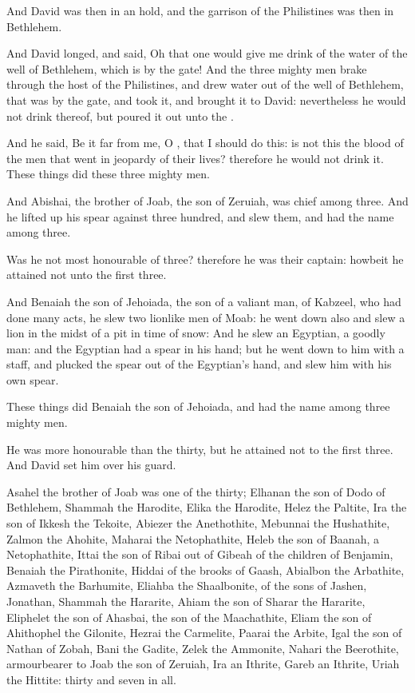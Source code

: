 \Verse And David was then in an hold, and the garrison of the Philistines was then in Bethlehem.

\Verse And David longed, and said, Oh that one would give me drink of the water of the well of Bethlehem, which is by the gate!  \Verse And the three mighty men brake through the host of the Philistines, and drew water out of the well of Bethlehem, that was by the gate, and took it, and brought it to David: nevertheless he would not drink thereof, but poured it out unto the \LORD.

\Verse And he said, Be it far from me, O \LORD, that I should do this: is not this the blood of the men that went in jeopardy of their lives?  therefore he would not drink it. These things did these three mighty men.

\Verse And Abishai, the brother of Joab, the son of Zeruiah, was chief among three. And he lifted up his spear against three hundred, and slew them, and had the name among three.

\Verse Was he not most honourable of three? therefore he was their captain: howbeit he attained not unto the first three.

\Verse And Benaiah the son of Jehoiada, the son of a valiant man, of Kabzeel, who had done many acts, he slew two lionlike men of Moab: he went down also and slew a lion in the midst of a pit in time of snow: \Verse And he slew an Egyptian, a goodly man: and the Egyptian had a spear in his hand; but he went down to him with a staff, and plucked the spear out of the Egyptian's hand, and slew him with his own spear.

\Verse These things did Benaiah the son of Jehoiada, and had the name among three mighty men.

\Verse He was more honourable than the thirty, but he attained not to the first three. And David set him over his guard.

\Verse Asahel the brother of Joab was one of the thirty; Elhanan the son of Dodo of Bethlehem, \Verse Shammah the Harodite, Elika the Harodite, \Verse Helez the Paltite, Ira the son of Ikkesh the Tekoite, \Verse Abiezer the Anethothite, Mebunnai the Hushathite, \Verse Zalmon the Ahohite, Maharai the Netophathite, \Verse Heleb the son of Baanah, a Netophathite, Ittai the son of Ribai out of Gibeah of the children of Benjamin, \Verse Benaiah the Pirathonite, Hiddai of the brooks of Gaash, \Verse Abialbon the Arbathite, Azmaveth the Barhumite, \Verse Eliahba the Shaalbonite, of the sons of Jashen, Jonathan, \Verse Shammah the Hararite, Ahiam the son of Sharar the Hararite, \Verse Eliphelet the son of Ahasbai, the son of the Maachathite, Eliam the son of Ahithophel the Gilonite, \Verse Hezrai the Carmelite, Paarai the Arbite, \Verse Igal the son of Nathan of Zobah, Bani the Gadite, \Verse Zelek the Ammonite, Nahari the Beerothite, armourbearer to Joab the son of Zeruiah, \Verse Ira an Ithrite, Gareb an Ithrite, \Verse Uriah the Hittite: thirty and seven in all.


